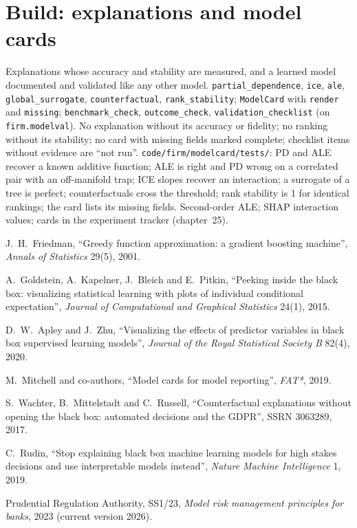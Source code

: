 \section{Build: explanations and model cards}\label{bld:ml:interpretability-and-model-governance:modelcard}

\begin{build}
 Explanations whose accuracy and stability are measured, and a learned model documented and validated like any
other model.
 \texttt{partial\_dependence}, \texttt{ice}, \texttt{ale}, \texttt{global\_surrogate},
\texttt{counterfactual}, \texttt{rank\_stability}; \texttt{ModelCard} with \texttt{render} and \texttt{missing};
\texttt{benchmark\_check}, \texttt{outcome\_check}, \texttt{validation\_checklist} (on \texttt{firm.modelval}).
 No explanation without its accuracy or fidelity; no ranking without its stability; no card with missing fields
marked complete; checklist items without evidence are ``not run''.
 \texttt{code/firm/modelcard/tests/}: PD and ALE recover a known additive function; ALE is right and
PD wrong on a correlated pair with an off-manifold trap; ICE slopes recover an interaction; a surrogate of a tree is perfect;
counterfactuals cross the threshold; rank stability is 1 for identical rankings; the card lists its missing fields.
 Second-order ALE; SHAP interaction values; cards in the experiment tracker (chapter~25).
\end{build}

\begin{omsources}
\item J.~H.~Friedman, ``Greedy function approximation: a gradient boosting machine'', \emph{Annals of Statistics} 29(5), 2001.
\item A.~Goldstein, A.~Kapelner, J.~Bleich and E.~Pitkin, ``Peeking inside the black box: visualizing statistical learning with
plots of individual conditional expectation'', \emph{Journal of Computational and Graphical Statistics} 24(1), 2015.
\item D.~W.~Apley and J.~Zhu, ``Visualizing the effects of predictor variables in black box supervised learning models'',
\emph{Journal of the Royal Statistical Society B} 82(4), 2020.
\item M.~Mitchell and co-authors, ``Model cards for model reporting'', \emph{FAT*}, 2019.
\item S.~Wachter, B.~Mittelstadt and C.~Russell, ``Counterfactual explanations without opening the black box: automated
decisions and the GDPR'', SSRN 3063289, 2017.
\item C.~Rudin, ``Stop explaining black box machine learning models for high stakes decisions and use interpretable models
instead'', \emph{Nature Machine Intelligence} 1, 2019.
\item Prudential Regulation Authority, SS1/23, \emph{Model risk management principles for banks}, 2023 (current version
2026).
\end{omsources}

